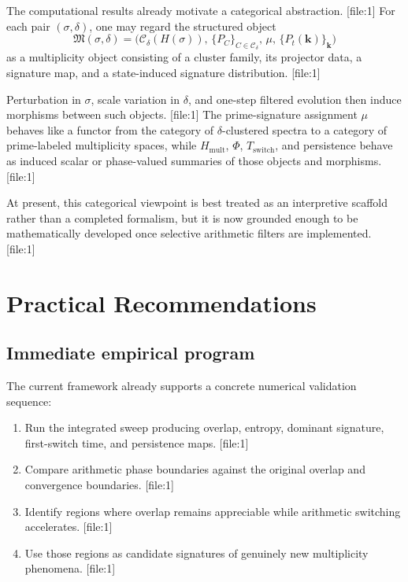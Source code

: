 \documentclass[11pt]{article}
\begin{document}
The computational results already motivate a categorical abstraction. [file:1] For each pair $(\sigma,\delta)$, one may regard the structured object
\[
\mathfrak M(\sigma,\delta) = \big(\mathcal C_{\delta}(H(\sigma)),\, \{P_C\}_{C\in\mathcal C_{\delta}},\, \mu,\, \{P_t(\mathbf{k})\}_{\mathbf{k}}\big)
\]
as a multiplicity object consisting of a cluster family, its projector data, a signature map, and a state-induced signature distribution. [file:1]

Perturbation in $\sigma$, scale variation in $\delta$, and one-step filtered evolution then induce morphisms between such objects. [file:1] The prime-signature assignment $\mu$ behaves like a functor from the category of $\delta$-clustered spectra to a category of prime-labeled multiplicity spaces, while $H_{\mathrm{mult}}$, $\Phi$, $T_{\mathrm{switch}}$, and persistence behave as induced scalar or phase-valued summaries of those objects and morphisms. [file:1]

At present, this categorical viewpoint is best treated as an interpretive scaffold rather than a completed formalism, but it is now grounded enough to be mathematically developed once selective arithmetic filters are implemented. [file:1]

\section{Practical Recommendations}

\subsection{Immediate empirical program}

The current framework already supports a concrete numerical validation sequence:
\begin{enumerate}
    \item Run the integrated sweep producing overlap, entropy, dominant signature, first-switch time, and persistence maps. [file:1]
    \item Compare arithmetic phase boundaries against the original overlap and convergence boundaries. [file:1]
    \item Identify regions where overlap remains appreciable while arithmetic switching accelerates. [file:1]
    \item Use those regions as candidate signatures of genuinely new multiplicity phenomena. [file:1]
\end{enumerate}
\end{document}
